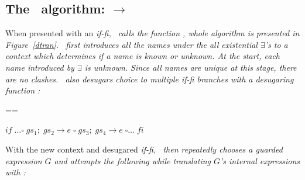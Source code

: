\documentclass[manuscript,screen,review, 12pt, nonacm]{acmart}
\begin{document}
    \subsection{The \DTran\ algorithm: \VMinus $\rightarrow$ \D}

    \algrenewcommand{}
    \algrenewcommand{}
    \algrenewcommand{}
    \newcommand\alet\algorithmicwhile
    \newcommand\ain\algorithmicdo
    \newcommand\aend\algorithmicend

    \newcommand\branches{\ensuremath{\mathit{branches}}}
    \newcommand\mg{\ensuremath{-}}


    When presented with an \it{if-fi}, \DTran\ calls the function \Compile,
    whole algorithm is presented in Figure~\ref{dtran}. \DTran\ first introduces
    all the names under the all existential $\exists$'s to a context which
    determines if a name is \it{known} or \it{unknown}. At the start, each name
    introduced by $\exists$ is \it{unknown}. Since all names are unique at this
    stage, there are no clashes. \DTran\ also desugars choice to multiple
    \it{if-fi} branches with a desugaring function \ITran: 

    
    ==
    
    ${if\; \dots \square\; gs_{1};\; gs_{2} \rightarrow e \;\square\; gs_{3};\; gs_{4} \rightarrow e \;\square \dots \;fi}$


    With the new context and desugared \it{if-fi}, \Compile\ then repeatedly
    chooses a guarded expression $G$ and attempts the following while
    translating $G$'s internal expressions with \DTran: 
\end{document}
